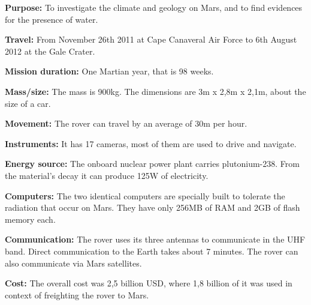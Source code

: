 \begin{tcolorbox}[colback=green!5,colframe=green!40!black,title=Curiosity: 10 facts about the rover]

\textbf{Purpose:} To investigate the climate and geology on Mars, and to find evidences for the presence of water.

\textbf{Travel:} From November 26th 2011 at Cape Canaveral Air Force to 6th August 2012 at the Gale Crater.

\textbf{Mission duration:} One Martian year, that is 98 weeks.

\textbf{Mass/size:} The mass is 900kg. The dimensions are 3m x 2,8m x 2,1m, about the size of a car.

\textbf{Movement:} The rover can travel by an average of 30m per hour.

\textbf{Instruments:} It has 17 cameras, most of them are used to drive and navigate.

\textbf{Energy source:} The onboard nuclear power plant carries plutonium-238. From the material's decay it can produce 125W of electricity.

\textbf{Computers:} The two identical computers are specially built to tolerate the radiation that occur on Mars. They have only 256MB of RAM and 2GB of flash memory each.

\textbf{Communication:} The rover uses its three antennas to communicate in the UHF band. Direct communication to the Earth takes about 7 minutes. The rover can also communicate via Mars satellites.

\textbf{Cost:} The overall cost was 2,5 billion USD, where 1,8 billion of it was used in context of freighting the rover to Mars.

\end{tcolorbox}